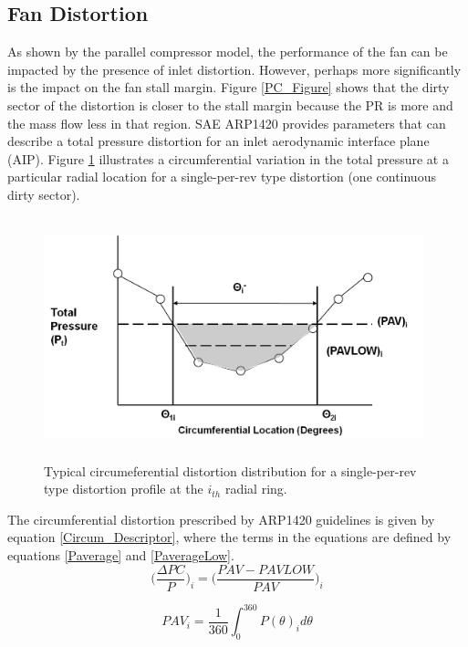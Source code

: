 \documentclass[12pt]{gatech-thesis}
\begin{document}
\subsection{Fan Distortion}
As shown by the parallel compressor model, the performance of the fan can be impacted by the presence of inlet distortion.  However, perhaps more significantly is the impact on the fan stall margin.  Figure \ref{PC_Figure} shows that the dirty sector of the distortion is closer to the stall margin because the PR is more and the mass flow less in that region.  SAE ARP1420 \cite{ARP1420} provides parameters that can describe a total pressure distortion for an inlet aerodynamic interface plane (AIP).  Figure \ref{Circumferential_Distortion} illustrates a circumferential variation in the total pressure at a particular radial location for a single-per-rev type distortion (one continuous dirty sector).
	\begin{figure}[htpb]
	\centering
	\includegraphics[width=110mm, height =70mm, clip=true, trim = 0mm 0mm 0mm 0mm]{Circumferential_Distortion.png}
	\caption{Typical circumeferential distortion distribution for a single-per-rev type distortion profile at the $i_{th}$ radial ring.}
	\label{Circumferential_Distortion}
	\end{figure}
The circumferential distortion prescribed by ARP1420 guidelines is given by equation \ref{Circum_Descriptor}, where the terms in the equations are defined by equations \ref{Paverage} and \ref{PaverageLow}.
\begin{equation}\Big(\frac{\Delta PC}
			          {P}\Big)_i = \Big(\frac{PAV-PAVLOW}
							  {PAV}\Big)_i
\label{Circum_Descriptor}\end{equation}%

\begin{equation}PAV_i = \frac{1}
 				      {360} \int_0^{360}{P(\theta)_i d\theta}
\label{Paverage}\end{equation}%
\end{document}

